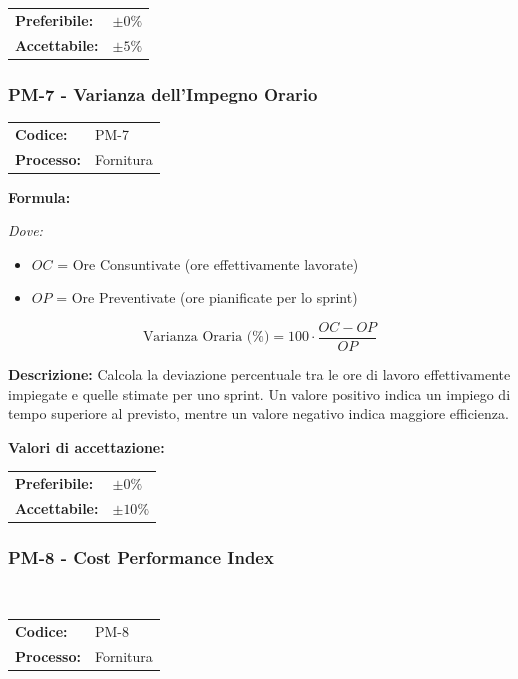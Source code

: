 \documentclass[a4paper,11pt,oneside]{scrartcl}
\begin{document}
\noindent
\begin{tabular}{@{}ll@{}}
\textbf{Preferibile:} & $\pm 0\%$ \\
\textbf{Accettabile:} & $\pm 5\%$ \\
\end{tabular}

\subsubsection{PM-7 - Varianza dell'Impegno Orario}

\noindent
\begin{tabular}{@{}p{}p{}@{}}
\textbf{Codice:} & PM-7 \\
\textbf{Processo:} & Fornitura \\
\end{tabular}

\vspace{0.3cm}
\noindent\textbf{Formula:}

\noindent\textit{Dove:}
\begin{itemize}[leftmargin=1.5cm, topsep=0pt, itemsep=0pt]
    \item $OC$ = Ore Consuntivate (ore effettivamente lavorate)
    \item $OP$ = Ore Preventivate (ore pianificate per lo sprint)
\end{itemize}

\[
\text{Varianza Oraria (\%)} = 100 \cdot \frac{OC - OP}{OP}
\]

\noindent\textbf{Descrizione:} Calcola la deviazione percentuale tra le ore di lavoro effettivamente impiegate e quelle stimate per uno sprint. Un valore positivo indica un impiego di tempo superiore al previsto, mentre un valore negativo indica maggiore efficienza.

\vspace{0.2cm}
\noindent\textbf{Valori di accettazione:}
\vspace{0.1cm}

\noindent
\begin{tabular}{@{}ll@{}}
\textbf{Preferibile:} & $\pm 0\%$ \\
\textbf{Accettabile:} & $\pm 10\%$ \\
\end{tabular}

\subsubsection{PM-8 - Cost Performance Index}
 
\noindent
\begin{tabular}{@{}p{}p{}@{}}
\textbf{Codice:} & PM-8 \\
\textbf{Processo:} & Fornitura \\
\end{tabular}
\end{document}

